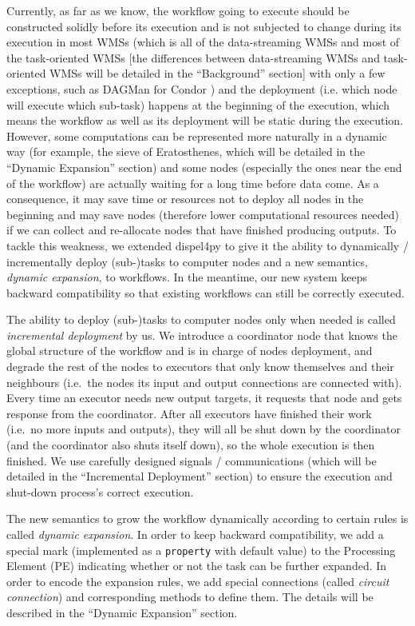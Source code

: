 \documentclass[msc,cs,logo]{infthesis}
\begin{document}
	Currently, as far as we know, the workflow going to execute should be constructed solidly before its execution and is not subjected to change during its execution in most WMSs (which is all of the data-streaming WMSs and most of the task-oriented WMSs [the differences between data-streaming WMSs and task-oriented WMSs will be detailed in the ``Background'' section] with only a few exceptions, such as DAGMan for Condor \cite{couvares2007workflow}) and the deployment (i.e. which node will execute which sub-task) happens at the beginning of the execution, which means the workflow as well as its deployment will be static during the execution. However, some computations can be represented more naturally in a dynamic way (for example, the sieve of Eratosthenes, which will be detailed in the ``Dynamic Expansion'' section) and some nodes (especially the ones near the end of the workflow) are actually waiting for a long time before data come. As a consequence, it may save time or resources not to deploy all nodes in the beginning and may save nodes (therefore lower computational resources needed) if we can collect and re-allocate nodes that have finished producing outputs. To tackle this weakness, we extended dispel4py to give it the ability to dynamically / incrementally deploy (sub-)tasks to computer nodes and a new semantics, \textit{dynamic expansion}, to workflows. In the meantime, our new system keeps backward compatibility so that existing workflows can still be correctly executed.
	
	The ability to deploy (sub-)tasks to computer nodes only when needed is called \emph{incremental deployment} by us. We introduce a coordinator node that knows the global structure of the workflow and is in charge of nodes deployment, and degrade the rest of the nodes to executors that only know themselves and their neighbours (i.e.\ the nodes its input and output connections are connected with). Every time an executor needs new output targets, it requests that node and gets response from the coordinator. After all executors have finished their work (i.e.\ no more inputs and outputs), they will all be shut down by the coordinator (and the coordinator also shuts itself down), so the whole execution is then finished. We use carefully designed signals / communications (which will be detailed in the ``Incremental Deployment'' section) to ensure the execution and shut-down process's correct execution.
	
	The new semantics to grow the workflow dynamically according to certain rules is called \emph{dynamic expansion}. In order to keep backward compatibility, we add a special mark (implemented as a \lstinline|property| with default value) to the Processing Element (PE) indicating whether or not the task can be further expanded. In order to encode the expansion rules, we add special connections (called \emph{circuit connection}) and corresponding methods to define them. The details will be described in the ``Dynamic Expansion'' section.
	
\end{document}
